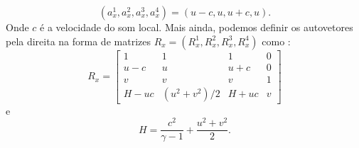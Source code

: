 \documentclass[a4paper, twoside, 12pt]{article}
\numberwithin{equation}{section}
\begin{document}
\begin{equation}
\left ( a^{1}_x,a^{2}_x,a^{3}_x,a^{4}_x \right )=\left ( u-c,u,u+c,u \right ).
\end{equation}
Onde $c$ é a velocidade do som local. Mais ainda, podemos definir os autovetores pela direita na forma de matrizes $R_{x}=\left (R_{x}^{1},R_{x}^{2},R_{x}^{3},R_{x}^{4}  \right )$ como :
\begin{equation}
R_{x}=\begin{bmatrix}
1    & 1               & 1    & 0\\ 
u-c  & u               & u+c  & 0\\ 
v    & v               & v    & 1\\ 
H-uc & (u^{2}+v^{2})/2 & H+uc & v
\end{bmatrix}
\end{equation}
e
\begin{equation}
H=\frac{c^{2}}{\gamma-1}+\frac{u^{2}+v^{2}}{2}.
\end{equation}
\end{document}
